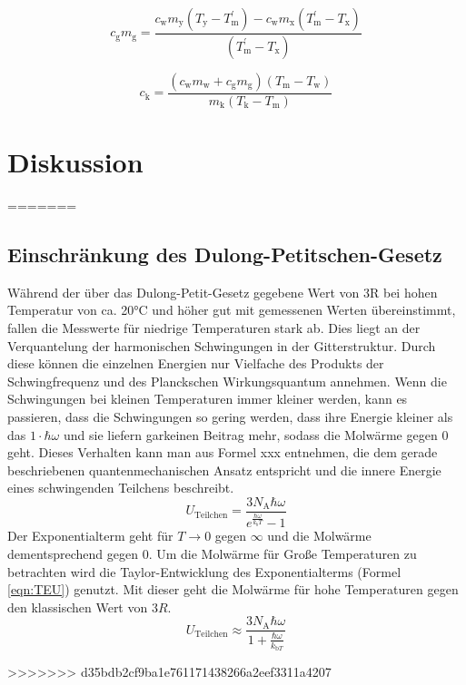 \documentclass[titlepage = firstcover]{scrartcl}
\begin{document}
            \begin{equation}
                \label{eqn:Wärmekapazität}
                c_\text{g} m_\text{g} = \frac{c_\text{w} m_\text{y}(T_\text{y} - T_\text{m}^{'}) - c_\text{w} m_\text{x}(T_\text{m}^{'} - T_\text{x})}{(T_\text{m}^{'} - T_\text{x})}
            \end{equation}

            \begin{equation}
                \label{eqn:spezWärmekapazität}
                c_\text{k} = \frac{(c_\text{w} m_\text{w} + c_\text{g} m_\text{g})(T_\text{m} - T_\text{w})}{m_\text{k}(T_\text{k} - T_\text{m})}
            \end{equation}
    
    
    \section{Diskussion}

=======
          
          \subsection{Einschränkung des Dulong-Petitschen-Gesetz}
            Während der über das Dulong-Petit-Gesetz gegebene Wert von 3R bei hohen Temperatur von ca. 20°C und höher gut mit gemessenen Werten übereinstimmt,
            fallen die Messwerte für niedrige Temperaturen stark ab. Dies liegt an der Verquantelung der harmonischen Schwingungen in der Gitterstruktur. 
            Durch diese können die einzelnen Energien nur Vielfache des Produkts der Schwingfrequenz und des Planckschen Wirkungsquantum annehmen. Wenn 
            die Schwingungen bei kleinen Temperaturen immer kleiner werden, kann es passieren, dass die Schwingungen so gering werden, dass ihre Energie
            kleiner als das $1 \cdot \hbar \omega$ und sie liefern garkeinen Beitrag mehr, sodass die Molwärme gegen 0 geht. Dieses Verhalten kann man aus Formel
            xxx entnehmen, die dem gerade beschriebenen quantenmechanischen Ansatz entspricht und die innere Energie eines schwingenden Teilchens beschreibt.
            \begin{equation}
              U_{\text{Teilchen}} = \frac{3 N_{\text{A}} \hbar \omega}{e^{\frac{\hbar \omega}{k_bT}}-1}
              \label{eqn:QU}
            \end{equation} 
            Der Exponentialterm geht für $T \rightarrow 0$ gegen $\infty$ und die Molwärme dementsprechend gegen 0. Um die Molwärme für Große Temperaturen
            zu betrachten wird die Taylor-Entwicklung des Exponentialterms (Formel \eqref{eqn:TEU}) genutzt. Mit dieser geht die Molwärme für hohe Temperaturen gegen 
            den klassischen Wert von $3R$.
            \begin{equation}
              U_{\text{Teilchen}} \approx \frac{3 N_{\text{A}} \hbar \omega}{1 + \frac{\hbar \omega}{k_{\text{b}T}}}
              \label{eqn:TEU}
            \end{equation} 

        
        
>>>>>>> d35bdb2cf9ba1e761171438266a2eef3311a4207
\end{document}
